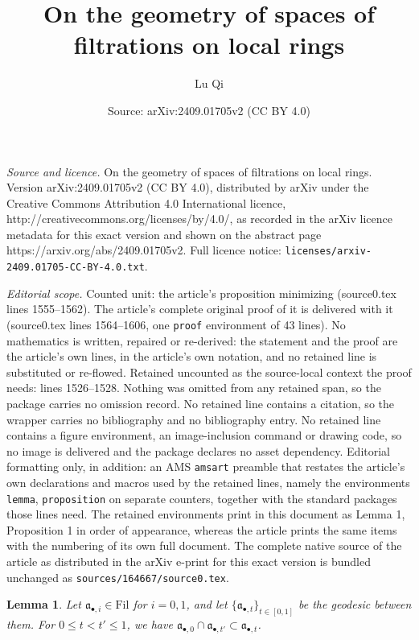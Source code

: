 \documentclass[10pt,a4paper]{amsart}
\title{On the geometry of spaces of filtrations on local rings}
\author{Lu Qi}
\date{Source: arXiv:2409.01705v2 (CC BY 4.0)}
\newtheorem{lemma}{Lemma}
\newcommand{\Fil}{\mathrm{Fil}}
\newcommand{\fa}{\mathfrak{a}}
\begin{document}
\maketitle

\noindent\emph{Source and licence.} On the geometry of spaces of filtrations on local rings. Version arXiv:2409.01705v2 (CC BY 4.0), distributed by arXiv under the Creative Commons Attribution 4.0 International licence, http://creativecommons.org/licenses/by/4.0/, as recorded in the arXiv licence metadata for this exact version and shown on the abstract page https://arxiv.org/abs/2409.01705v2. Full licence notice: \texttt{licenses/arxiv-2409.01705-CC-BY-4.0.txt}.\par\smallskip

\noindent\textit{Editorial scope.} Counted unit: the article's proposition minimizing (source0.tex lines 1555--1562). The article's complete original proof of it is delivered with it (source0.tex lines 1564--1606, one \texttt{proof} environment of 43 lines). No mathematics is written, repaired or re-derived: the statement and the proof are the article's own lines, in the article's own notation, and no retained line is substituted or re-flowed.  Retained uncounted as the source-local context the proof needs: lines 1526--1528.  Nothing was omitted from any retained span, so the package carries no omission record.  No retained line contains a citation, so the wrapper carries no bibliography and no bibliography entry.  No retained line contains a figure environment, an image-inclusion command or drawing code, so no image is delivered and the package declares no asset dependency.  Editorial formatting only, in addition: an AMS \texttt{amsart} preamble that restates the article's own declarations and macros used by the retained lines, namely the environments \texttt{lemma}, \texttt{proposition} on separate counters, together with the standard packages those lines need.  The retained environments print in this document as Lemma 1, Proposition 1 in order of appearance, whereas the article prints the same items with the numbering of its own full document.  The complete native source of the article as distributed in the arXiv e-print for this exact version is bundled unchanged as \texttt{sources/164667/source0.tex}.
\begin{lemma}\label{lem:subinterval}
    Let $\fa_{\bullet,i}\in\Fil$ for $i=0,1$, and let $\{\fa_{\bullet,t}\}_{t\in[0,1]}$ be the geodesic between them. For $0\le t<t'\le 1$, we have $\fa_{\bullet,0}\cap\fa_{\bullet,t'}\subset\fa_{\bullet,t}$. 
\end{lemma}
\end{document}

